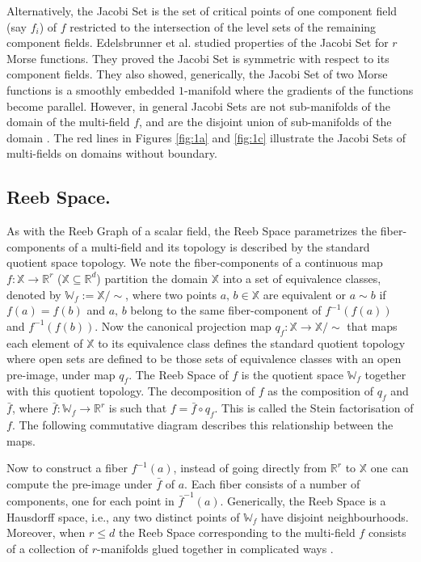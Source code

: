 \documentclass[twocolumn]{article}
\newcommand{\R}{\mathbb{R}}
\newcommand{\RS}{\mathbb{W}_f}
\newcommand{\twofigref}[2]{Figures \ref{fig:#1} and \ref{fig:#2}}
\begin{document}
Alternatively, the Jacobi Set is the set of  critical
points of one component field (say $f_i$) of $f$ restricted to the intersection of the level
sets of the remaining component fields. Edelsbrunner et al. \cite{2004-edels-jacobi} studied properties of the Jacobi Set for $r$
Morse functions. They proved the Jacobi Set is symmetric with respect to its component
fields. They also showed, generically, the Jacobi Set of two Morse functions is a smoothly embedded
$1$-manifold where the gradients of the functions become
parallel. However, in general Jacobi Sets
are not sub-manifolds of the domain of the multi-field $f$,
and are the disjoint union of sub-manifolds
of the domain \cite{2004-edels-jacobi}. 
The red lines in \twofigref{1a}{1c}
illustrate the Jacobi Sets of multi-fields on domains without boundary.


\subsection*{Reeb Space.} As with the Reeb Graph of a scalar field,
 the Reeb Space parametrizes the fiber-components of a
 multi-field and its topology is described by the
 standard quotient space topology.
We note the fiber-components of a continuous map
$f:\mathbb{X}\rightarrow \mathbb{R}^r$ ($\mathbb{X}\subseteq
\mathbb{R}^d$) partition the domain $\mathbb{X}$ into a set 
of equivalence classes, denoted by $\RS:=\mathbb{X}/\sim$,
where two points $a,\,b\in \mathbb{X}$ are equivalent or $a\sim b$ if
$f(a)=f(b)$ and $a,\, b$ belong to the same fiber-component of $f^{-1}(f(a))$ and $f^{-1}(f(b))$. 
Now the canonical projection map
$q_f:\mathbb{X}\rightarrow \mathbb{X}/\sim$ that maps each element of $\mathbb{X}$
to its equivalence class defines the standard quotient topology where
open sets are defined to be those sets of equivalence classes with an
open pre-image, under map $q_f$. The Reeb Space of $f$ is the quotient
space $\RS$ together with this quotient topology.
The decomposition of $f$ as the composition of $q_f$ and $\bar{f}$,
where $\bar{f}:\RS\rightarrow\R^r$ is such that $f=\bar{f}\circ q_f$. This is called the Stein factorisation of $f$.
The following commutative diagram describes this relationship between the maps.
\begin{center}
\end{center}
\noindent
Now to construct a fiber $f^{-1}(a)$, instead of going directly from
$\mathbb{R}^r$ to $\mathbb{X}$ one can compute the pre-image under $\bar{f}$ of
$a$. Each fiber consists of a number of components, one for each point in $\bar{f}^{-1}(a)$.
Generically, the Reeb Space is a Hausdorff space, i.e., any two distinct points of
 $\RS$ have disjoint neighbourhoods.
Moreover, when $r\leq d$ the Reeb Space corresponding to the multi-field
$f$ consists of a collection of $r$-manifolds glued together in
complicated ways \cite{2008-edels-reebspace}.
\end{document}
